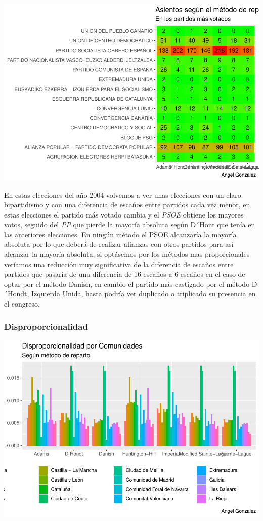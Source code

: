 \documentclass[12pt,a4paper,]{book}
\numberwithin{dummy}{section}
\theoremstyle{ocrenumbox}
\theoremstyle{blacknumex}
\theoremstyle{blacknumbox}
\theoremstyle{ocrenum}
\theoremstyle{ocrenum}
\begin{document}
\begin{center}\includegraphics[width=0.95\linewidth]{figurasR/unnamed-chunk-83-2} \end{center}

En estas elecciones del año 2004 volvemos a ver unas elecciones con un
claro bipartidismo y con una diferencia de escaños entre partidos cada
vez menor, en estas elecciones el partido más votado cambia y el
\emph{PSOE} obtiene los mayores votos, seguido del \emph{PP} que pierde
la mayoría absoluta según D´Hont que tenía en las anteriores elecciones.
En ningún método el PSOE alcanzaría la mayoría absoluta por lo que
deberá de realizar alianzas con otros partidos para así alcanzar la
mayoría absoluta, si optásemos por los métodos mas proporcionales
veríamos una reducción muy significativa de la diferencia de escaños
entre partidos que pasaría de una diferencia de 16 escaños a 6 escaños
en el caso de optar por el método Danish, en cambio el partido más
castigado por el método D´Hondt, Izquierda Unida, hasta podría ver
duplicado o triplicado su presencia en el congreso.

\hypertarget{disproporcionalidad-7}{%
\subsubsection{Disproporcionalidad}\label{disproporcionalidad-7}}

\begin{center}\includegraphics[width=0.95\linewidth]{figurasR/unnamed-chunk-84-1} \end{center}
\end{document}
